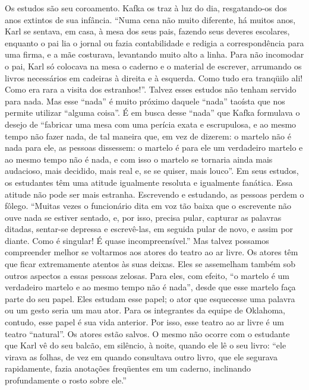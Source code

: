 Os estudos são seu coroamento. Kafka os traz à luz do dia, resgatando-os
dos anos extintos de sua infância. ``Numa cena não muito diferente, há
muitos anos, Karl se sentava, em casa, à mesa dos seus pais, fazendo
seus deveres escolares, enquanto o pai lia o jornal ou fazia
contabilidade e redigia a correspondência para uma firma, e a mãe
costurava, levantando muito alto a linha. Para não incomodar o pai, Karl
só colocava na mesa o caderno e o material de escrever, arrumando os
livros necessários em cadeiras à direita e à esquerda. Como tudo era
tranqüilo ali! Como era rara a visita dos estranhos!''. Talvez esses
estudos não tenham servido para nada. Mas esse ``nada'' é muito próximo
daquele ``nada'' taoísta que nos permite utilizar ``alguma coisa''. É em
busca desse ``nada'' que Kafka formulava o desejo de ``fabricar uma mesa
com uma perícia exata e escrupulosa, e ao mesmo tempo não fazer nada, de
tal maneira que, em vez de dizerem: o martelo não é nada para ele, as
pessoas dissessem: o martelo é para ele um verdadeiro martelo e ao mesmo
tempo não é nada, e com isso o martelo se tornaria ainda mais audacioso,
mais decidido, mais real e, se se quiser, mais louco''. Em seus estudos,
os estudantes têm uma atitude igualmente resoluta e igualmente fanática.
Essa atitude não pode ser mais estranha. Escrevendo e estudando, as
pessoas perdem o fôlego. ``Muitas vezes o funcionário dita em voz tão
baixa que o escrevente não ouve nada se estiver sentado, e, por isso,
precisa pular, capturar as palavras ditadas, sentar-se depressa e
escrevê-las, em seguida pular de novo, e assim por diante. Como é
singular! É quase incompreensível.'' Mas talvez possamos compreender
melhor se voltarmos aos atores do teatro ao ar livre. Os atores têm que
ficar extremamente atentos às suas deixas. Eles se assemelham também sob
outros aspectos a essas pessoas zelosas. Para eles, com efeito, ``o
martelo é um verdadeiro martelo e ao mesmo tempo não é nada'', desde que
esse martelo faça parte do seu papel. Eles estudam esse papel; o ator
que esquecesse uma palavra ou um gesto seria um mau ator. Para os
integrantes da equipe de Oklahoma, contudo, esse papel é sua vida
anterior. Por isso, esse teatro ao ar livre é um teatro ``natural''. Os
atores estão salvos. O mesmo não ocorre com o estudante que Karl vê do
seu balcão, em silêncio, à noite, quando ele lê o seu livro: ``ele
virava as folhas, de vez em quando consultava outro livro, que ele
segurava rapidamente, fazia anotações freqüentes em um caderno,
inclinando profundamente o rosto sobre ele.''

